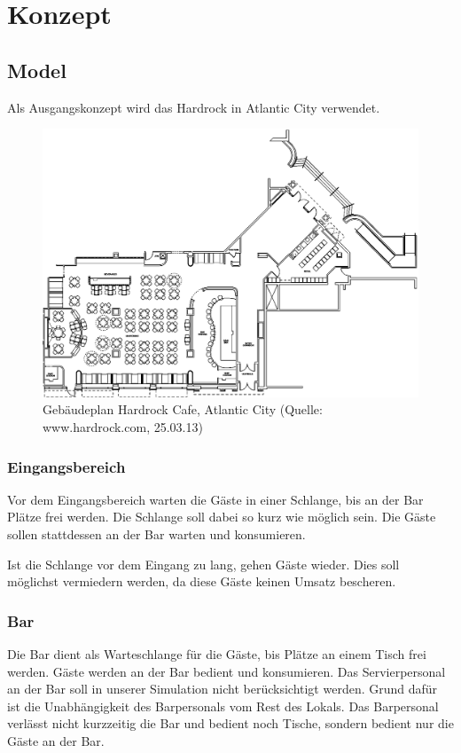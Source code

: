 \documentclass[ngerman,a4paper,12pt]{scrreprt}
\begin{document}
\tableofcontents


\chapter{Konzept}


\section{Model}
Als Ausgangskonzept wird das Hardrock in Atlantic City verwendet.
\begin{figure}[htp]
	\centering
		\includegraphics[width=1\textwidth]{img/hardrock-plan.png}
		\caption[Gebäudeplan Hardrock]{Gebäudeplan Hardrock Cafe, Atlantic City (Quelle: www.hardrock.com, 25.03.13)}
		\label{planHardrock}
\end{figure}

\subsection{Eingangsbereich}
Vor dem Eingangsbereich warten die Gäste in einer Schlange, bis an der Bar Plätze frei werden. Die Schlange soll dabei so kurz wie möglich sein. Die Gäste sollen stattdessen an der Bar warten und konsumieren.

Ist die Schlange vor dem Eingang zu lang, gehen Gäste wieder. Dies soll möglichst vermiedern werden, da diese Gäste keinen Umsatz bescheren.

\subsection{Bar}
Die Bar dient als Warteschlange für die Gäste, bis Plätze an einem Tisch frei werden. Gäste werden an der Bar bedient und konsumieren.
Das Servierpersonal an der Bar soll in unserer Simulation nicht berücksichtigt werden. Grund dafür ist die Unabhängigkeit des Barpersonals vom Rest des Lokals. Das Barpersonal verlässt nicht kurzzeitig die Bar und bedient noch Tische, sondern bedient nur die Gäste an der Bar.
\end{document}
